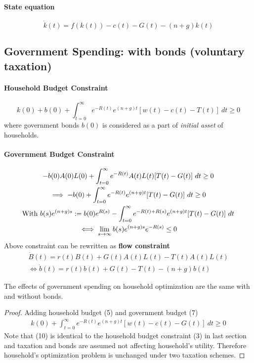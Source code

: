 \documentclass[11pt]{article}
\begin{document}
			\paragraph{State equation} 
			\begin{equation}
				\dot{k}(t) = f(k(t)) - c(t) - G(t) - (n+g)k(t)
			\end{equation}
		
		\subsection{Government Spending: with bonds (voluntary taxation)}
			\paragraph{Household Budget Constraint}
				\begin{equation}
					k(0) + b(0) + \int_{t=0}^\infty {e^{-R(t)} e^{(n+g)t} [w(t) - c(t) - T(t)]}\ dt \geq 0
				\end{equation}
				where government bonds $b(0)$ is considered as a part of \emph{initial asset} of households.
			\paragraph{Government Budget Constraint}
				\begin{gather}
					-b(0) A(0) L(0) + \int_{t=0}^\infty e^{-R(t)} A(t)L(t) [T(t) - G(t)]\ dt \geq 0 \\
					\implies -b(0) + \int_{t=0}^{\infty} e^{-R(t)} e^{(n+g)t} [T(t) - G(t)]\ dt \geq 0 \\
					\text{{With }}b(s)e^{(n+g)s} := b(0)e^{R(s)} - \int_{t=0}^{\infty} e^{-R(t)+R(s)} e^{(n+g)t} [T(t) - G(t)]\ dt\\
					\iff \lim_{s\to \infty} b(s) e^{(n+g)s} e^{-R(s)} \leq 0
				\end{gather}
				Above constraint can be rewritten as \textbf{flow constraint}
				\begin{gather}
					\dot{B}(t) = r(t)B(t) + G(t)A(t)L(t) -T(t)A(t)L(t) \\
					\iff \dot{b}(t) = r(t)b(t) + G(t) - T(t) - (n+g)b(t)
				\end{gather}
			\begin{proposition}
				The effects of government spending on household optimization are the same with and without bonds.
			\end{proposition}
				\begin{proof}
					Adding household budget (5) and government budget (7)
				\begin{gather}
					k(0) + \int_{t=0}^\infty {e^{-R(t)} e^{(n+g)t} [w(t) - c(t) - G(t)]}\ dt \geq 0
				\end{gather}
				Note that (10) is identical to the household budget constraint (3) in last section and taxation and bonds are assumed not affecting household's utility. Therefore household's optimization problem is unchanged under two taxation schemes.
				\end{proof}
				
\end{document}
